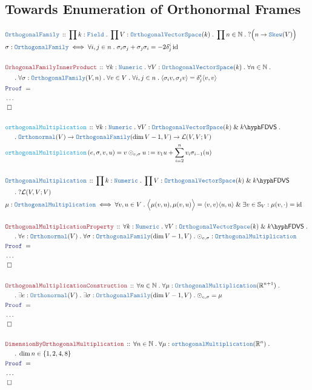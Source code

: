\documentclass[12pt]{scrartcl}%
\newcommand{\TYPE}[1]{\textcolor{NavyBlue}{\mathtt{#1}}}%
\newcommand{\FUNC}[1]{\textcolor{Cerulean}{\mathtt{#1}}}%
\newcommand{\LOGIC}[1]{\textcolor{Blue}{\mathtt{#1}}}%
\newcommand{\THM}[1]{\textcolor{Maroon}{\mathtt{#1}}}%
\renewcommand{\.}{\; . \;} %
\newcommand{\de}{: \kern 0.1pc =} %
\newcommand{\Act}[1]{\left( #1 \right)} %
\newcommand{\Theorem}[2]{& \THM{#1} \, :: \, #2 \\ & \Proof = \\ } %
\newcommand{\DeclareType}[2]{& \TYPE{#1} \, :: \, #2 \\}%
\newcommand{\DefineType}[3]{& #1 : \TYPE{#2} \iff #3 \\}%
\newcommand{\DeclareFunc}[2]{& \FUNC{#1} \, :: \, #2 \\}%
\newcommand{\DefineNamedFunc}[4]{&  \FUNC{#1}\Act{#2} = #3 \de #4 \\}%
\newcommand{\NewLine}{\\ & \kern 1pc}%
\newcommand{\Page}[1]{ \begin{align*} #1 \end{align*}  }%
\newcommand{\NoProof}{ & \ldots \\ \EndProof}%
\renewcommand{\And}{\; \& \;}%
\newcommand{\Reals}{\mathbb{R}}%
\newcommand{\Nat}{\mathbb{N}}%
\DeclareMathOperator*{\id}{id}%
\newcommand{\QED}{\; \square} %
\newcommand{\EndProof}{& \QED \\} %
\newcommand{\Proof}{\LOGIC{Proof} \; } %
\newcommand{\OVS}{\TYPE{OrthogonalVectorSpace}}
\newcommand{\FDVS}[1]{#1\hyph\mathsf{FDVS}} %
\renewcommand{\L}{\mathcal{L}}
\newcommand{\Field}{\TYPE{Field}}
\begin{document}
\subsection{Towards Enumeration of Orthonormal Frames}
\Page{
	\DeclareType{OrthogonalFamily}
	{
		\prod k : \Field \.
		\prod V : \OVS(k) \.
		\prod n \in \Nat \. 
		?\Big(n \to \TYPE{Skew}(V)\Big)
	}
	\DefineType{\sigma}{OrthogonalFamily}
	{  
		\forall i,j \in n \. \sigma_i \sigma_j + \sigma_j \sigma_i = 
		-2\delta^i_j \id 
	}
	\\
	\Theorem{OrhogonalFamilyInnerProduct}
	{
		\forall k : \TYPE{Numeric} \.
		\forall V : \OVS(k) \.
		\forall n \in \Nat \. \NewLine \. 
		\forall \sigma : \TYPE{OrthogonalFamily}(V,n) \.
		\forall v \in V \.
		\forall i,j \in n \.
		\langle \sigma_i v , \sigma_j v \rangle = 
		\delta^i_j \langle v, v \rangle
	}
	\NoProof
	\\
	\DeclareFunc{orthogonalMultiplication}
	{
		\forall k : \TYPE{Numeric} \.
		\forall V : \OVS(k) \And \FDVS{k}\. \NewLine \. 
		\TYPE{Orthonormal}(V) \to
		 \TYPE{OrthogonalFamily}(\dim V - 1,V) \to
		\L(V,V;V)
	}
	\DefineNamedFunc{orthogonalMultiplication}{e,\sigma,v,u}
	{v \odot_{e,\sigma} u}{v_1 u + \sum^n_{i=2} v_i \sigma_{i-1}(u)}   
	\\
	\DeclareType{OrthogonalMultiplication}
	{
		\prod k : \TYPE{Numeric} \.
		\prod V : \OVS(k) \And \FDVS{k} \NewLine \.
		?\L(V,V;V)
	}
	\DefineType{\mu}{OrthogonalMultiplication}
	{
		\forall v,u \in V \.
		\Big\langle\mu(v,u) ,\mu(v,u)\Big\rangle = 
		\langle v, v \rangle \langle u, u \rangle
		\And \exists v \in \mathbb{S}_V : \mu(v,\cdot) = \id
	}
	\\
	\Theorem{OrthogonalMultiplicationProperty}
	{
		\forall k : \TYPE{Numeric} \. 
		\forall V : \OVS(k) \And \FDVS{k} \. \NewLine \.
		\forall e : \TYPE{Orthonormal}(V) \.  
		\forall \sigma : \TYPE{OrthogonalFamily}(\dim V -1,V) \.
		\odot_{e,\sigma} : \TYPE{OrthogonalMultiplication}
	}
	\NoProof
	\\
	\Theorem{OrthogonalMultiplicationConstruction}
	{
		\forall n \in \Nat \. 
		\forall \mu : \TYPE{OrthogonalMultiplication}(\Reals^{n+1}) \.
		\NewLine \. 
		\exists  e : \TYPE{Orthonormal}(V) \.  
		\exists  \sigma : \TYPE{OrthogonalFamily}(\dim V -1,V) \.
		\odot_{e,\sigma} = \mu
	}
	\NoProof
	\\
	\Theorem{DimensionByOrthogonalMultiplication}
	{
		\forall n \in \Nat \.
		\forall \mu : \TYPE{orthogonalMultiplication}(\Reals^n) \.
		\NewLine \.
		\dim n \in \{ 1,2,4,8\}
	}
	\NoProof
}
\end{document}
